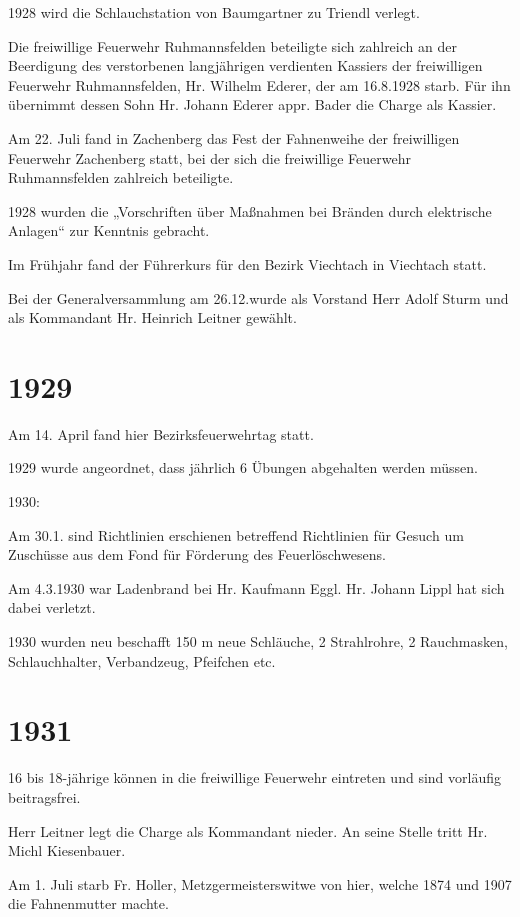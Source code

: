 \documentclass[12pt,a4paper]{book}
\begin{document}
1928 wird die Schlauchstation von Baumgartner zu Triendl verlegt.

Die freiwillige Feuerwehr Ruhmannsfelden beteiligte sich zahlreich an der
Beerdigung des verstorbenen langjährigen verdienten Kassiers der freiwilligen
Feuerwehr Ruhmannsfelden, Hr. Wilhelm Ederer, der am 16.8.1928 starb. Für ihn
übernimmt dessen Sohn Hr. Johann Ederer appr. Bader die Charge als Kassier.

Am 22. Juli fand in Zachenberg das Fest der Fahnenweihe der freiwilligen
Feuerwehr Zachenberg statt, bei der sich die freiwillige Feuerwehr
Ruhmannsfelden zahlreich beteiligte.

1928 wurden die „Vorschriften über Maßnahmen bei Bränden durch elektrische
Anlagen“ zur Kenntnis gebracht.

Im Frühjahr fand der Führerkurs für den Bezirk Viechtach in Viechtach statt.

Bei der Generalversammlung am 26.12.wurde als Vorstand Herr Adolf Sturm und als
Kommandant Hr. Heinrich Leitner gewählt.

\section*{1929}

Am 14. April fand hier Bezirksfeuerwehrtag statt.

1929 wurde angeordnet, dass jährlich 6 Übungen abgehalten werden müssen.

1930:

Am 30.1. sind Richtlinien erschienen betreffend Richtlinien für Gesuch um
Zuschüsse aus dem Fond für Förderung des Feuerlöschwesens.

Am 4.3.1930 war Ladenbrand bei Hr. Kaufmann Eggl. Hr. Johann Lippl hat sich
dabei verletzt.

1930 wurden neu beschafft 150 m neue Schläuche, 2 Strahlrohre, 2 Rauchmasken,
Schlauchhalter, Verbandzeug, Pfeifchen etc.

\section*{1931}

16 bis 18-jährige können in die freiwillige Feuerwehr eintreten und sind
vorläufig beitragsfrei.

Herr Leitner legt die Charge als Kommandant nieder. An seine Stelle tritt Hr.
Michl Kiesenbauer.

Am 1. Juli starb Fr. Holler, Metzgermeisterswitwe von hier, welche 1874 und 1907
die Fahnenmutter machte.
\end{document}
